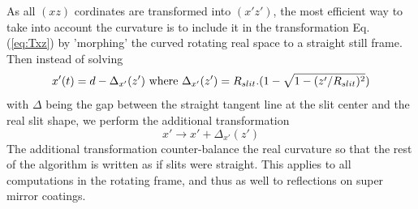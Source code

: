 As all $(xz)$ cordinates are transformed into $(x'z')$, the most efficient way to take into account the curvature is to include it in the transformation Eq. (\ref{eq:Txz}) by 'morphing' the curved rotating real space to a straight still frame. Then instead of solving
\begin{equation}x'(t) = d - \Delta_{x'}(z') {\rm\ where\ } \Delta_{x'}(z')=R_{slit}.(1-\sqrt{1-(z'/R_{slit})^2})
\end{equation}
with $\Delta$ being the gap between the straight tangent line at the slit center and the real slit shape, we perform the additional transformation
\begin{equation}
x' \rightarrow x' + \Delta_{x'}(z')
\end{equation}
The additional transformation counter-balance the real curvature so that the rest of the algorithm is written as if slits were straight.
This applies to all computations in the rotating frame, and thus as well to reflections on super mirror coatings.
